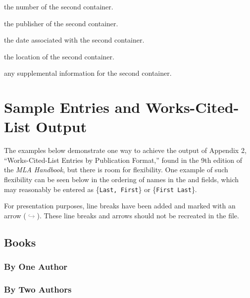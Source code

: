 \documentclass{ltxdockit}
\newcommand*{\mlafield}[1]{\textcolor{teal}{\sty{#1}}\xspace}
\newenvironment*{optionslistNOT}
  {\list{}{%
     \setlength{\labelwidth}{\marglistwidth}%
     \setlength{\labelsep}{\marglistsep}%
     \setlength{\leftmargin}{50pt}%
     \renewcommand*{\makelabel}[1]{\hss\marglistfont##1}}%
   \def\optionitem##1{%
     \item[{\textbf{##1}}]}}
  {\endlist}
\begin{document}
\begin{optionslistNOT}
	\optionitem{\mlafield{numberb}} the number of the second container.
	
	\optionitem{\mlafield{publisherb}} the publisher of the second container.
	
	\optionitem{\mlafield{dateb}} the date associated with the second container.
	
	\optionitem{\mlafield{locationb}} the location of the second container.
	
	\optionitem{\mlafield{supplementalb}} any supplemental information for the second container.
	
	

\end{optionslistNOT}


\section{Sample \bibtex Entries and Works-Cited-List Output} %
\label{sec:sample_bibtex_entries_and_output}\label{mla:sec:samples}
\noindent{}The examples below demonstrate one way to achieve the output of Appendix 2, ``Works-Cited-List Entries by Publication Format,'' found in the 9th edition of the \emph{MLA Handbook}, but there is room for flexibility. One example of such flexibility can be seen below in the ordering of names in the \mlafield{author} and \mlafield{editor} fields, which may reasonably be entered as \{\texttt{Last, First}\} or \{\texttt{First Last}\}.

For presentation purposes, line breaks have been added and marked with an arrow (\textcolor{gray}{$\hookrightarrow$}). These line breaks and arrows should not be recreated in the  file.
\subsection{Books} %
\label{sec:books}
\subsubsection{By One Author} %
\label{ssub:by_one_author}
\begin{refsection}
	\printbibliography[heading=none]
\end{refsection}
\subsubsection{By Two Authors} %
\label{ssub:by_two_authors}
\begin{refsection}
	\printbibliography[heading=none]
\end{refsection}
\end{document}
